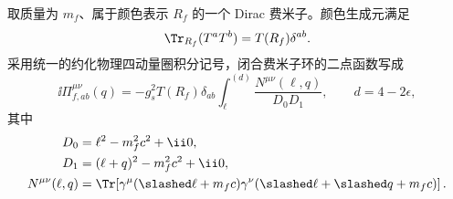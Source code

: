 \begin{derivation}
取质量为 $m_f$、属于颜色表示 $R_f$ 的一个 Dirac 费米子。颜色生成元满足
\begin{equation*}
 \Tr_{R_f}(T^aT^b)=T(R_f)\delta^{ab}.
\end{equation*}
采用统一的约化物理四动量圈积分记号，闭合费米子环的二点函数写成
\begin{equation*}
 \ii\Pi_{f,ab}^{\mu\nu}(q)
 =-g_s^2T(R_f)\delta_{ab}
 \int_\ell^{(d)}
 \frac{N^{\mu\nu}(\ell,q)}
 {D_0D_1},
 \qquad d=4-2\epsilon,
\end{equation*}
其中
\begin{align*}
 D_0&=\ell^2-m_f^2c^2+\ii0,\\
 D_1&=(\ell+q)^2-m_f^2c^2+\ii0,\\
 N^{\mu\nu}(\ell,q)
 &=\Tr\!\left[
 \gamma^\mu(\slashed\ell+m_fc)
 \gamma^\nu(\slashed\ell+\slashed q+m_fc)
 \right].
\end{align*}


\end{derivation}
